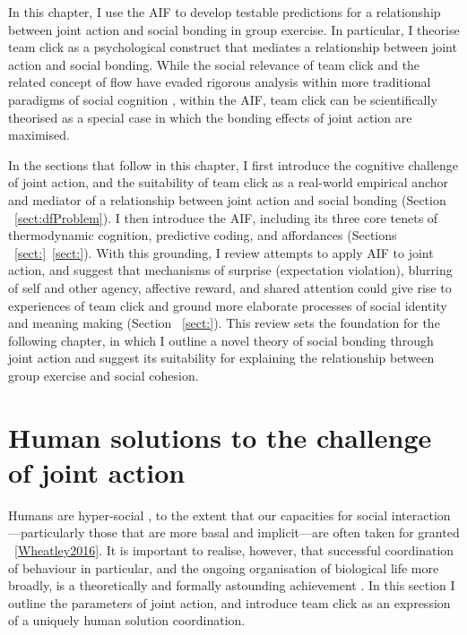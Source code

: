 \begin{CJK}{UTF8}{gbsn}
In this chapter, I use the AIF to develop testable predictions for a relationship between joint action and social bonding in group exercise.  In particular, I theorise team click as a psychological construct that mediates a relationship between joint action and social bonding.  While the social relevance of team click and the related concept of flow have evaded rigorous analysis within more traditional paradigms of social cognition \cite[for explanations as to why, see][]{Dietrich2004,Slingerland2014}, within the AIF, team click can be scientifically theorised as a special case in which the bonding effects of joint action are maximised.


In the sections that follow in this chapter, I first introduce the cognitive challenge of joint action, and the suitability of team  click as a real-world empirical anchor and mediator of a relationship between joint action and social bonding (Section ~\ref{sect:dfProblem}).  I then introduce the AIF, including its three core tenets of thermodynamic cognition, predictive coding, and affordances (Sections ~\ref{sect:}\nobreakdash~\ref{sect:}).  With this grounding, I review attempts to apply AIF to joint action, and suggest that mechanisms of surprise (expectation violation), blurring of self and other agency, affective reward, and shared attention could give rise to experiences of team click and ground more elaborate processes of social identity and meaning making  (Section ~\ref{sect:}).  This review sets the foundation for the following chapter, in which I outline a novel theory of social bonding through joint action and suggest its suitability for explaining the relationship between group exercise and social cohesion.




\section{Human solutions to the challenge of joint action\label{sect:dfProblem}}
Humans are hyper-social \citep{Tomasello2012a}, to the extent that our capacities for social interaction---particularly those that are more basal and implicit---are often taken for granted ~\ref{Wheatley2016}.  It is important to realise, however, that successful coordination of behaviour in particular, and the ongoing organisation of biological life more broadly, is a theoretically and formally astounding achievement \citep{Schrodinger1944}.  In this section I outline the parameters of joint action, and introduce team click as an expression of a uniquely human solution coordination.


\end{CJK}

